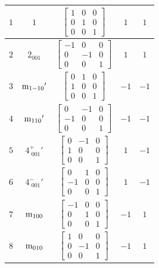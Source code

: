 \documentclass[fleqn,8pt]{jsarticle}
\begin{document}
\begin{longtable}{ccccc}
$ 1 $ & $ 1 $ & $ \begin{bmatrix} 1 & 0 & 0 \\ 0 & 1 & 0 \\ 0 & 0 & 1 \end{bmatrix} $ & $ 1 $ & $ 1 $ \\ \hline
$ 2 $ & $ 2{}_{001} $ & $ \begin{bmatrix} -1 & 0 & 0 \\ 0 & -1 & 0 \\ 0 & 0 & 1 \end{bmatrix} $ & $ 1 $ & $ 1 $ \\ \hline
$ 3 $ & $ {\rm m}_{1-10}{}' $ & $ \begin{bmatrix} 0 & 1 & 0 \\ 1 & 0 & 0 \\ 0 & 0 & 1 \end{bmatrix} $ & $ -1 $ & $ -1 $ \\ \hline
$ 4 $ & $ {\rm m}_{110}{}' $ & $ \begin{bmatrix} 0 & -1 & 0 \\ -1 & 0 & 0 \\ 0 & 0 & 1 \end{bmatrix} $ & $ -1 $ & $ -1 $ \\ \hline
$ 5 $ & $ 4^{+}_{\,\,001}{}' $ & $ \begin{bmatrix} 0 & -1 & 0 \\ 1 & 0 & 0 \\ 0 & 0 & 1 \end{bmatrix} $ & $ 1 $ & $ -1 $ \\ \hline
$ 6 $ & $ 4^{-}_{\,\,001}{}' $ & $ \begin{bmatrix} 0 & 1 & 0 \\ -1 & 0 & 0 \\ 0 & 0 & 1 \end{bmatrix} $ & $ 1 $ & $ -1 $ \\ \hline
$ 7 $ & $ {\rm m}_{100} $ & $ \begin{bmatrix} -1 & 0 & 0 \\ 0 & 1 & 0 \\ 0 & 0 & 1 \end{bmatrix} $ & $ -1 $ & $ 1 $ \\ \hline
$ 8 $ & $ {\rm m}_{010} $ & $ \begin{bmatrix} 1 & 0 & 0 \\ 0 & -1 & 0 \\ 0 & 0 & 1 \end{bmatrix} $ & $ -1 $ & $ 1 $ \\
\end{longtable}
\end{document}
